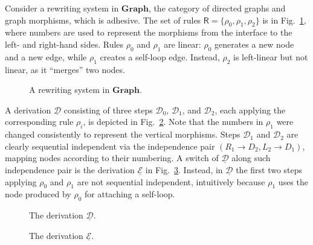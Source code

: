 \documentclass[a4paper,UKenglish,cleveref,pdftex,thm-restate,numberwithinsect]{lipics-v2021}
\newcommand{\cat}[1]{\ensuremath{\mathbf{#1}}}
\def\R{\mathsf{R}}
\newcommand{\dder}[1]{\mathscr{#1}}
\newcommand{\der}[1]{\underline{\dder{#1}}}
\newtheorem*{notation}{Notation}
\begin{document}

\begin{example}
  \label{ex:seq-ind}
  Consider a rewriting system in $\cat{Graph}$, the category of
  directed graphs and graph morphisms, which is adhesive. The set of
  rules $\R = \{ \rho_0, \rho_1, \rho_2\}$ is in
  Fig.~\ref{fi:rules}, where numbers are used to represent the
  morphisms from the interface to the left- and right-hand
  sides. Rules $\rho_0$ and $\rho_1$ are linear: $\rho_0$ generates a
  new node and a new edge, while $\rho_1$ creates a self-loop edge. Instead,
  $\rho_2$ is left-linear but not linear, as it ``merges'' two nodes.

  \begin{figure}
    
    \caption{A rewriting system in $\cat{Graph}$.}
    \label{fi:rules}
  \end{figure}
  
  A derivation $\der{D}$ consisting of three steps $\dder{D}_0$,
  $\dder{D}_1$, and $\dder{D}_2$, each applying the corresponding rule
  $\rho_i$, is depicted in Fig.~\ref{fi:derD}. Note that the numbers in $\rho_1$
  were changed consistently to represent the vertical morphisms.
  Steps $\dder{D}_1$ and $\dder{D}_2$ are clearly sequential
  independent via the independence pair $(R_1 \to D_2, L_2 \to D_1)$,
  mapping nodes according to their numbering.
  A switch of $\der{D}$ along such independence pair is the derivation
  $\der{E}$ in Fig.~\ref{fi:derE}. Instead, in $\der{D}$ the first two
  steps applying $\rho_0$ and $\rho_1$ are not sequential independent,
  intuitively because $\rho_1$ uses the node produced by $\rho_0$ for
  attaching a self-loop.
  
  \begin{figure}[t]
    
    \caption{The derivation $\der{D}$.}
    \label{fi:derD}
  \end{figure}

  
  \begin{figure}[b]
    
    \caption{The derivation $\der{E}$.}
    \label{fi:derE}
  \end{figure}
\end{example}
\end{document}

